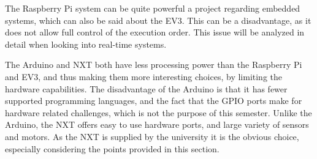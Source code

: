 The Raspberry Pi system can be quite powerful a project regarding embedded systems, which can also be said about the EV3.
This can be a disadvantage, as it does not allow full control of the execution order.
This issue will be analyzed in detail when looking into real-time systems.

The Arduino and NXT both have less processing power than the Raspberry Pi and EV3, and thus making them more interesting choices, by limiting the hardware capabilities.
The disadvantage of the Arduino is that it has fewer supported programming languages, and the fact that the GPIO ports make for hardware related challenges, which is not the purpose of this semester.
Unlike the Arduino, the NXT offers easy to use hardware ports, and large variety of sensors and motors.
As the NXT is supplied by the university it is the obvious choice, especially considering the points provided in this section.

